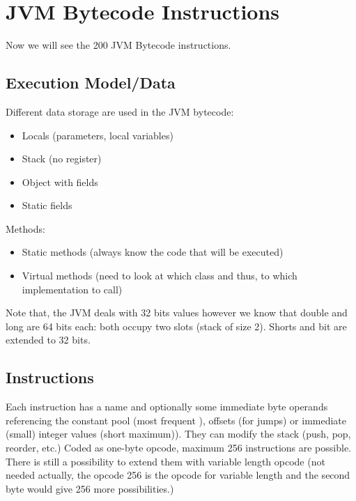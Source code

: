 \section{JVM Bytecode Instructions}
Now we will see the 200 JVM Bytecode instructions.
\subsection{Execution Model/Data}
Different data storage are used in the JVM bytecode:
\begin{itemize}
    \item Locals (parameters, local variables)
    \item Stack (no register)
    \item Object with fields
    \item Static fields
\end{itemize}
Methods:
\begin{itemize}
    \item Static methods (always know the code that will be executed)
    \item Virtual methods (need to look at which class and thus, to which implementation to call)
\end{itemize}

Note that, the JVM deals with 32 bits values however we know that double and
long are 64 bits each: both occupy two slots (stack of size 2). Shorts and bit
are extended to 32 bits.

\subsection{Instructions}
\theoremstyle{definition}
\begin{definition}
    Each instruction has a name and optionally some immediate byte operands
    referencing the constant pool (most frequent ), offsets (for jumps) or
    immediate (small) integer values (short maximum)). They can modify the stack
    (push, pop, reorder, etc.) Coded as one-byte opcode, maximum 256
    instructions are possible. There is still a possibility to extend them with
    variable length opcode (not needed actually, the opcode 256 is the opcode
    for variable length and the second byte would give 256 more possibilities.)
\end{definition}

